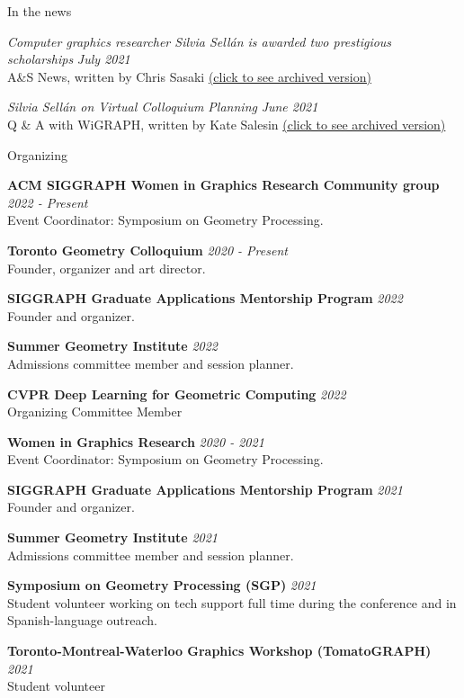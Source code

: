 \documentclass{resume}
\newcommand{\cvitem}[3]{
    {\bf #1} \hfill {\em \small #2} \\ 
    {\small#3 }
}
\begin{document}
\begin{rSection}{In the news}

{\it Computer graphics researcher Silvia Sellán is awarded two prestigious scholarships} \hfill {\small \it July 2021}\\ 
{\small A\&S News, written by Chris Sasaki \href{https://web.cs.toronto.edu/news-events/news/silvia-sellan-scholarships}{(click to see archived version)}} 

{\it Silvia Sellán on Virtual Colloquium Planning} \hfill {\small \it June 2021}\\ 
{\small Q \& A with WiGRAPH, written by Kate Salesin \href{https://www.wigraph.org/spotlights/silvia-sellan-on-virtual-colloquium-planning/}{(click to see archived version)}} 

\end{rSection}

\begin{rSection}{Organizing}

\cvitem{ACM SIGGRAPH Women in Graphics Research Community group}{2022 - Present}{Event Coordinator: Symposium on Geometry Processing.}
    
\cvitem{Toronto Geometry Colloquium}{2020 - Present}{Founder, organizer and art director.}

\cvitem{SIGGRAPH Graduate Applications Mentorship Program}{2022} 
{Founder and organizer.}

\cvitem{Summer Geometry Institute}{2022} 
{Admissions committee member and session planner.}

\cvitem{CVPR Deep Learning for Geometric Computing}{2022} 
{Organizing Committee Member}

\cvitem{Women in Graphics Research}{2020 - 2021}{Event Coordinator: Symposium on Geometry Processing.}

\cvitem{SIGGRAPH Graduate Applications Mentorship Program}{2021} 
{Founder and organizer.}

\cvitem{Summer Geometry Institute}{2021} 
{Admissions committee member and session planner.}

\cvitem{Symposium on Geometry Processing (SGP)}{2021} 
{Student volunteer working on tech support full time during the conference and in Spanish-language outreach.}

\cvitem{Toronto-Montreal-Waterloo Graphics Workshop (TomatoGRAPH)}{2021} 
{Student volunteer}





\end{rSection}
\end{document}
